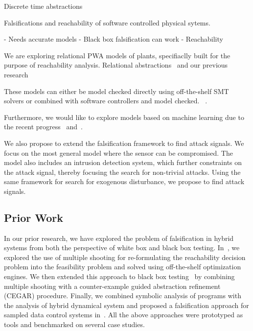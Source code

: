 
Discrete time abstractions

Falsifications and reachability of software controlled physical
sytems.

- Needs accurate models
- Black box falsification can work
- Reachability
%


We are exploring relational PWA models of plants,
specifiaclly built for the purpose of reachability analysis.
Relational abstractions~\cite{Tiwari2012} and our previous
research~\cite{zutshi2012timed}

These
models can either be model checked directly using off-the-shelf SMT
solvers or combined with software controllers and model checked.
~\cite{Zutshi2016}.

Furthermore, we would like to explore models based on machine learning
due to the recent progress~\cite{pulina2012challenging,
pulina2011never, pulina2011checking} and~\cite{katz2017reluplex}.



We also propose to extend the falsification framework to find attack
signals. We focus on the most general model where the sensor
can be compromised. The model also includes an intrusion detection
system, which further constraints on the attack signal, thereby
focusing the search for non-trivial attacks.
Using the same framework for search for exogenous disturbance, we
propose to find attack signals.

\subsection{Prior Work}

In our prior research, we have explored the problem of falsification
in hybrid systems from both the perspective of white box and black box
testing. In~\cite{Zutshi+Others/2013/Trajectory}, we explored the use
of multiple shooting for re-formulating the reachability decision
problem into the feasibility problem and solved using off-the-shelf
optimization engines. We then extended this approach to black box
testing~\cite{zutshi2014multiple} by combining multiple shooting with
a counter-example guided abstraction refinement (CEGAR) procedure.
Finally, we combined symbolic analysis of programs with the analysis
of hybrid dynamical system and proposed a falsification approach for
sampled data control systems in~\cite{zutshi2016symbolic}. All the
above approaches were prototyped as tools and benchmarked on several
case studies.


